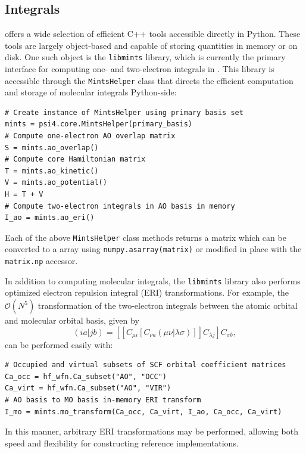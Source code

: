 \documentclass[%
  class = book,%
  crop = false,%
  float = true,%
  multi = true,%
  preview = false,%
]{standalone}
\let\cite\autocite
\begin{document}
\subsection{Integrals}

\pfour offers a wide selection of efficient C++ tools accessible directly in Python.  These tools are largely object-based and capable of storing quantities in memory or on disk.  One such object is the \texttt{libmints} library\cite{Psi41.1}, which is currently the primary interface for computing one- and two-electron integrals in \pfour.  This library is accessible through the \texttt{MintsHelper} class that directs the efficient computation and storage of molecular integrals Python-side:

\begin{verbatim}
# Create instance of MintsHelper using primary basis set
mints = psi4.core.MintsHelper(primary_basis)
# Compute one-electron AO overlap matrix
S = mints.ao_overlap()
# Compute core Hamiltonian matrix
T = mints.ao_kinetic()
V = mints.ao_potential()
H = T + V
# Compute two-electron integrals in AO basis in memory
I_ao = mints.ao_eri()
\end{verbatim}
Each of the above \texttt{MintsHelper} class methods returns a \pfour matrix which can be converted to a \numpy array using \texttt{numpy.asarray(matrix)} or modified in place with the \texttt{matrix.np} accessor.

In addition to computing molecular integrals, the \texttt{libmints} library also performs optimized electron repulsion integral (ERI) transformations. For example, the \(\mathcal{O}(N^5)\) transformation of the two-electron integrals between the atomic orbital and molecular orbital basis, given by
\begin{equation}
  (ia\vert jb) = \left[\left[C_{\mu i}\left[C_{\nu a}(\mu\nu\vert\lambda\sigma)\right]\right]C_{\lambda j}\right]C_{\sigma b},
  \label{eq:aomo}
\end{equation}
can be performed easily with:

\begin{verbatim}
# Occupied and virtual subsets of SCF orbital coefficient matrices
Ca_occ = hf_wfn.Ca_subset("AO", "OCC")
Ca_virt = hf_wfn.Ca_subset("AO", "VIR")
# AO basis to MO basis in-memory ERI transform
I_mo = mints.mo_transform(Ca_occ, Ca_virt, I_ao, Ca_occ, Ca_virt)
\end{verbatim}
In this manner, arbitrary ERI transformations may be performed, allowing both speed and flexibility for constructing reference implementations.
\end{document}
